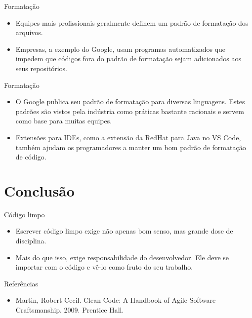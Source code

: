 \documentclass[11pt]{beamer}
\begin{document}
  \begin{frame}{Formatação}
    \begin{itemize}
      \item Equipes mais profissionais geralmente definem um padrão de formatação dos arquivos.
      \item Empresas, a exemplo do Google, usam programas automatizados que impedem que códigos fora do padrão de formatação sejam adicionados aos seus repositórios. 
    \end{itemize}
  \end{frame}

  \begin{frame}{Formatação}
    \begin{itemize}
      \item O Google publica seu padrão de formatação para diversas linguagens. Estes padrões são vistos pela indústria como práticas bastante racionais e servem como base para muitas equipes.
      \item Extensões para IDEs, como a extensão da RedHat para Java no VS Code, também ajudam os programadores a manter um bom padrão de formatação de código.
    \end{itemize}
  \end{frame}

  \section{Conclusão}

  \begin{frame}{Código limpo}
    \begin{itemize}
      \item Escrever código limpo exige não apenas bom senso, mas grande dose de disciplina.
      \item Mais do que isso, exige responsabilidade do desenvolvedor. Ele deve se importar com o código e vê-lo como fruto do seu trabalho.
    \end{itemize}
  \end{frame}

  \begin{frame}{Referências}
    \begin{itemize}
      \item Martin, Robert Cecil. Clean Code: A Handbook of Agile Software Craftsmanship. 2009. Prentice Hall.
    \end{itemize}
  \end{frame}
\end{document}
